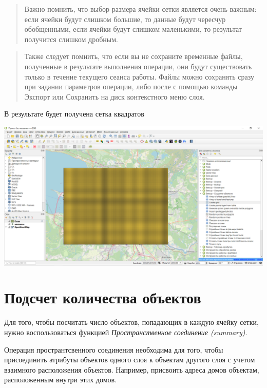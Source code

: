 \documentclass[
]{book}
\begin{document}
\begin{quote}
Важно помнить, что выбор размера ячейки сетки является очень важным: если ячейки будут слишком большие, то данные будут чересчур обобщенными, если ячейки будут слишком маленькими, то результат получится слишком дробным.
\end{quote}

\begin{quote}
Также следует помнить, что если вы не сохраните временные файлы, полученные в результате выполнения операции, они будут существовать только в течение текущего сеанса работы. Файлы можно сохранять сразу при задании параметров операции, либо после с помощью команды Экспорт или Сохранить на диск контекстного меню слоя.
\end{quote}

В результате будет получена сетка квадратов

\includegraphics{figures/16.PNG}

\hypertarget{ux43fux43eux434ux441ux447ux435ux442-ux43aux43eux43bux438ux447ux435ux441ux442ux432ux430-ux43eux431ux44aux435ux43aux442ux43eux432}{%
\section{Подсчет количества объектов}\label{ux43fux43eux434ux441ux447ux435ux442-ux43aux43eux43bux438ux447ux435ux441ux442ux432ux430-ux43eux431ux44aux435ux43aux442ux43eux432}}

Для того, чтобы посчитать число объектов, попадающих в каждую ячейку сетки, нужно воспользоваться функцией \emph{Пространственное соединение (summary)}.

Операция пространтсвенного соединения необходима для того, чтобы присоединить атрибуты объектов одного слоя к объектам другого слоя с учетом взаимного расположения объектов. Например, присвоить адреса домов объектам, расположенным внутри этих домов.
\end{document}
